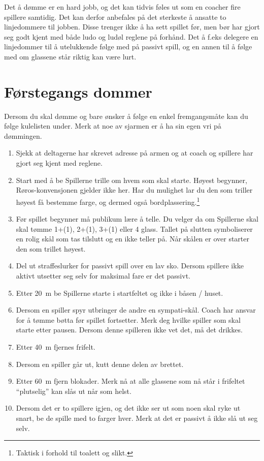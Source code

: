 \documentclass[10pt,a4paper,norsk,openany]{book}
\begin{document}
Det å dømme er en hard jobb, og det kan tidvis føles ut som en coacher fire
spillere samtidig. Det kan derfor anbefales på det sterkeste å ansatte to
linjedommere til jobben. Disse trenger ikke å ha sett spillet før, men bør har
gjort seg godt kjent med både ludo og ludøl reglene på forhånd. Det å f.eks
delegere en linjedommer til å utelukkende følge med på passivt spill, og en
annen til å følge med om glassene står riktig kan være lurt. 

\section{Førstegangs dommer} \label{sec:forstegangs-dommer} Dersom du skal
dømme og bare ønsker å følge en enkel fremgangsmåte kan du følge kulelisten
under. Merk at noe av sjarmen er å ha sin egen vri på dømmingen.
%
\begin{enumerate}
    \item Sjekk at deltagerne har skrevet adresse på armen og at coach og
    spillere har gjort seg kjent med reglene.
    
    \item Start med å be Spillerne trille om hvem som skal starte. Høyest
    begynner, Røros-konvensjonen gjelder ikke her. Har du mulighet lar du den
    som triller høyest få bestemme farge, og dermed også
    bordplassering.\footnote{Taktisk i forhold til toalett og slikt.}
    
  \item Før spillet begynner må publikum lære å telle. Du velger da om
    Spillerne skal skal tømme 1+(1), 2+(1), 3+(1) eller 4 glass. Tallet på
    slutten symboliserer en rolig skål som tas tilslutt og en ikke teller på.
    Når skålen er over starter den som trillet høyest.
    
  \item Del ut straffeslurker for passivt spill over en lav sko. Dersom spillere
    ikke aktivt utsetter seg selv for maksimal fare er det passivt.
    
  \item Etter \SI{20}{\m} be Spillerne starte i startfeltet og ikke i båsen /
    huset.
    
  \item Dersom en spiller spyr utbringer de andre en sympati-skål. Coach har
    ansvar for å tømme bøtta før spillet fortsetter. Merk deg hvilke spiller som
    skal starte etter pausen. Dersom denne spilleren ikke vet det, må det
    drikkes.
    
  \item Etter \SI{40}{m} fjernes frifelt.
    
  \item Dersom en spiller går ut, kutt denne delen av brettet.
    
  \item Etter \SI{60}{m} fjern blokader. Merk nå at alle glassene som nå står i
    frifeltet ``plutselig'' kan slås ut når som helst.
    
  \item Dersom det er to spillere igjen, og det ikke ser ut som noen skal ryke
    ut snart, be de spille med to farger hver. Merk at det er passivt å ikke slå
    ut seg selv. 
\end{enumerate}
\end{document}
